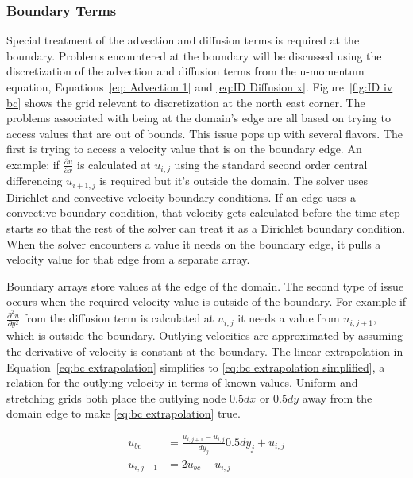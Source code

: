 \documentclass[onehalf,11pt]{beavtex}
\begin{document}
\subsubsection{Boundary Terms}
\label{sec:ID NS boundary}
Special treatment of the advection and diffusion terms is required at the boundary. 
Problems encountered at the boundary will be discussed using the discretization of the advection and diffusion terms from the u-momentum equation, Equations~\eqref{eq: Advection 1} and \eqref{eq:ID Diffusion x}.
Figure~\ref{fig:ID iv bc} shows the grid relevant to discretization at the north east corner. 
The problems associated with being at the domain's edge are all based on trying to access values that are out of bounds. 
This issue pops up with several flavors. 
The first is trying to access a velocity value that is on the boundary edge. 
An example: if $\frac{\partial u}{\partial x}$ is calculated at $u_{i,j}$ using the standard second order central differencing $u_{i+1,j}$ is required but it's outside the domain. 
The solver uses Dirichlet and convective velocity boundary conditions. 
If an edge uses a convective boundary condition, that velocity gets calculated before the time step starts so that the rest of the solver can treat it as a Dirichlet boundary condition. 
When the solver encounters a value it needs on the boundary edge, it pulls a velocity value for that edge from a separate array. 

Boundary arrays store values at the edge of the domain. 
The second type of issue occurs when the required velocity value is outside of the boundary. 
For example if $\frac{\partial^2 u}{\partial y^2}$ from the diffusion term is calculated at $u_{i,j}$ it needs a value from $u_{i,j+1}$, which is outside the boundary. 
Outlying velocities are approximated by assuming the derivative of velocity is constant at the boundary. 
The linear extrapolation in Equation~\eqref{eq:bc extrapolation} simplifies to \eqref{eq:bc extrapolation simplified}, a relation for the outlying velocity in terms of known values. 
Uniform and stretching grids both place the outlying node $0.5dx$ or $0.5dy$ away from the domain edge to make \eqref{eq:bc extrapolation} true. 

\begin{align}
u_{bc} &= \frac{u_{i,j+1} - u_{i,j}}{dy_j}0.5dy_j+ u_{i,j} \label{eq:bc extrapolation} \\
u_{i,j+1} &= 2u_{bc} - u_{i,j} \; \label{eq:bc extrapolation simplified}
\end{align}
\end{document}
